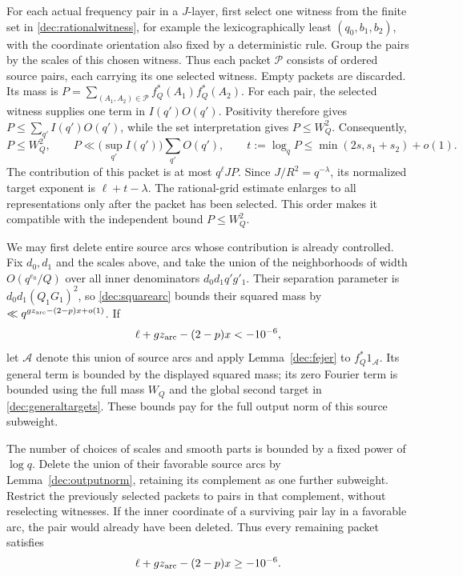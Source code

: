 \documentclass[11pt,a4paper]{article}
\theoremstyle{paperplain}
\numberwithin{equation}{section}
\begin{document}
For each actual frequency pair in a $J$-layer, first select one witness
from the finite set in \eqref{dec:rationalwitness}, for example the
lexicographically least $(q_0,b_1,b_2)$, with the coordinate orientation
also fixed by a deterministic rule. Group the pairs by the scales of
this chosen witness. Thus each packet $\mathcal P$ consists of ordered
source pairs, each carrying its one selected witness.
Empty packets are discarded. Its mass is
$P=\sum_{(A_1,A_2)\in\mathcal P}f_Q^*(A_1)f_Q^*(A_2)$.
For each pair, the selected witness supplies one term in
$I(q')O(q')$. Positivity therefore gives
$P\le\sum_{q'}I(q')O(q')$, while the set interpretation gives
$P\le W_Q^2$. Consequently,
\begin{equation}\label{dec:packetmass}
 P\le W_Q^2,\qquad
 P\ll \bigl(\sup_{q'} I(q')\bigr)\sum_{q'}O(q'),\qquad
 t:=\log_qP\le\min(2s,s_1+s_2)+o(1).
\end{equation}
The contribution of this packet is at most $q^\ell JP$.
Since $J/R^2=q^{-\lambda}$, its normalized target exponent is
$\ell+t-\lambda$.
The rational-grid estimate enlarges to all representations only after
the packet has been selected. This order makes it compatible with
the independent bound $P\le W_Q^2$.

We may first delete entire source arcs whose contribution is already
controlled. Fix $d_0,d_1$ and the scales above, and take the union of
the neighborhoods of width $O(q^{e_0}/Q)$ over all inner denominators
$d_0d_1q'g'_1$. Their separation parameter is $d_0d_1(Q_1G_1)^2$,
so \eqref{dec:squarearc} bounds their squared mass by
$\ll q^{gz_{\rm arc}-(2-p)x+o(1)}$. If
\[
 \ell+gz_{\rm arc}-(2-p)x<-10^{-6},
\]
let $\mathcal A$ denote this union of source arcs and apply
Lemma~\ref{dec:fejer} to $f_Q^*1_{\mathcal A}$.
Its general term is bounded by the displayed squared mass; its
zero Fourier term is bounded using the full mass $W_Q$ and the
global second target in \eqref{dec:generaltargets}.
These bounds pay for the full output norm of this source subweight.

The number of choices of scales and smooth parts is bounded by a
fixed power of $\log q$. Delete the union of their favorable source
arcs by Lemma~\ref{dec:outputnorm}, retaining its complement as one
further subweight. Restrict the previously selected packets to pairs
in that complement, without reselecting witnesses. If the inner
coordinate of a surviving pair lay in a favorable arc, the pair
would already have been deleted. Thus every remaining packet
satisfies
\begin{equation}\label{dec:arcfilter}
 \ell+gz_{\rm arc}-(2-p)x\ge-10^{-6}.
\end{equation}
\end{document}
